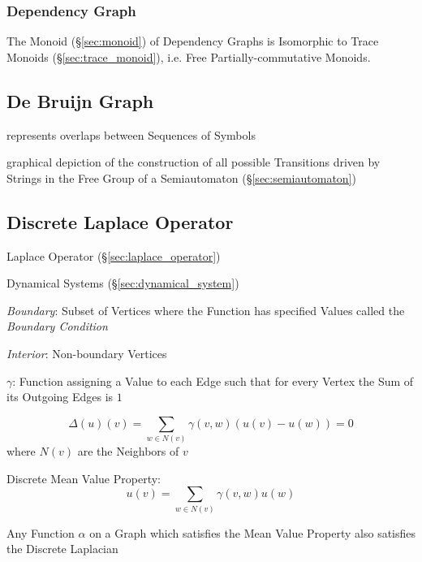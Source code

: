 \subsubsection{Dependency Graph}\label{sec:dependency_graph}

The Monoid (\S\ref{sec:monoid}) of Dependency Graphs is Isomorphic to
Trace Monoids (\S\ref{sec:trace_monoid}), i.e. Free
Partially-commutative Monoids.



\subsection{De Bruijn Graph}\label{sec:debruijn_graph}

represents overlaps between Sequences of Symbols

graphical depiction of the construction of all possible Transitions
driven by Strings in the Free Group of a Semiautomaton
(\S\ref{sec:semiautomaton})




\subsection{Discrete Laplace Operator}\label{sec:discrete_laplace}

Laplace Operator (\S\ref{sec:laplace_operator})

Dynamical Systems (\S\ref{sec:dynamical_system})

\emph{Boundary}: Subset of Vertices where the Function has specified
Values called the \emph{Boundary Condition}

\emph{Interior}: Non-boundary Vertices

$\gamma$: Function assigning a Value to each Edge such that for every
Vertex the Sum of its Outgoing Edges is $1$

\[
  \Delta(u)(v) = \sum_{w \in N(v)} \gamma(v,w)(u(v) - u(w)) = 0
\]
where $N(v)$ are the Neighbors of $v$


Discrete Mean Value Property:
\[
  u(v) = \sum_{w \in N(v)} \gamma (v,w)u(w)
\]

Any Function $\alpha$ on a Graph which satisfies the Mean Value
Property also satisfies the Discrete Laplacian



